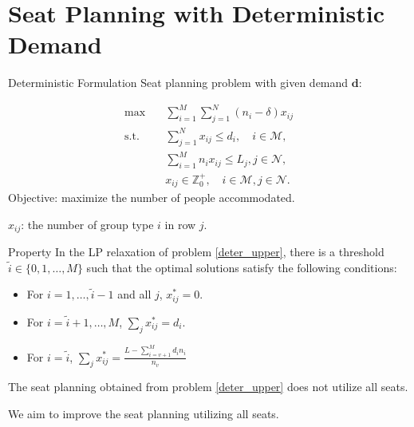 
\section{Seat Planning with Deterministic Demand}
    \frame{\sectionpage}

  \begin{frame}{Deterministic Formulation}  %
    Seat planning problem with given demand $\bm{d}$:

    \begin{equation}\label{deter_upper}
      \begin{aligned}
      \max \quad & \sum_{i=1}^{M}  \sum_{j= 1}^{N} (n_i- \delta) x_{ij} \\
      \text {s.t.} \quad & \sum_{j= 1}^{N} x_{ij} \leq d_{i}, \quad i \in \mathcal{M}, \\
      & \sum_{i=1}^{M} n_{i} x_{ij} \leq L_j, j \in \mathcal{N}, \\
      & x_{ij} \in \mathbb{Z}^{+}_{0}, \quad i \in \mathcal{M}, j \in \mathcal{N}.
      \end{aligned}
    \end{equation}
    Objective: maximize the number of people accommodated.

    $x_{ij}$: the number of group type $i$ in row $j$.
  \end{frame}

  \begin{frame}{Property}
    In the LP relaxation of problem \eqref{deter_upper}, there is a threshold $\tilde{i} \in\{0,1,\ldots, M\}$ such that the optimal solutions satisfy the following conditions:

    \begin{itemize}
      \item For $i = 1,\ldots, \tilde{i} -1$ and all $j$, $x_{ij}^{*} = 0$. 
      \item For $i = \tilde{i} +1,\ldots, M$, $\sum_{j} x_{ij}^{*} = d_{i}$. 

      \item For $i = \tilde{i}$, $\sum_{j} x_{ij}^{*} = \frac{L - \sum_{i = v+1}^{M} {d_i n_i}}{n_v}$ 
    \end{itemize}

    \vspace{0.5cm}
    The seat planning obtained from problem \eqref{deter_upper} does not utilize all seats.

    \vspace{0.5cm}
    
    We aim to improve the seat planning utilizing all seats.

  \end{frame}

